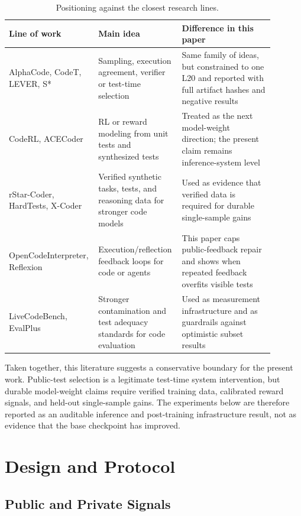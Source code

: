 \documentclass[11pt]{article}
\begin{document}
\begin{table}[H]
\centering
\small
\begin{tabular}{>{\raggedright\arraybackslash}p{0.25\linewidth}
                >{\raggedright\arraybackslash}p{0.30\linewidth}
                >{\raggedright\arraybackslash}p{0.34\linewidth}}
\toprule
Line of work & Main idea & Difference in this paper \\
\midrule
AlphaCode, CodeT, LEVER, S* & Sampling, execution agreement, verifier or
test-time selection & Same family of ideas, but constrained to one L20 and
reported with full artifact hashes and negative results \\
CodeRL, ACECoder & RL or reward modeling from unit tests and synthesized tests
& Treated as the next model-weight direction; the present claim remains
inference-system level \\
rStar-Coder, HardTests, X-Coder & Verified synthetic tasks, tests, and
reasoning data for stronger code models & Used as evidence that verified data
is required for durable single-sample gains \\
OpenCodeInterpreter, Reflexion & Execution/reflection feedback loops for code
or agents & This paper caps public-feedback repair and shows when repeated
feedback overfits visible tests \\
LiveCodeBench, EvalPlus & Stronger contamination and test adequacy standards
for code evaluation & Used as measurement infrastructure and as guardrails
against optimistic subset results \\
\bottomrule
\end{tabular}
\caption{Positioning against the closest research lines.}
\label{tab:positioning}
\end{table}

Taken together, this literature suggests a conservative boundary for the
present work. Public-test selection is a legitimate test-time system
intervention, but durable model-weight claims require verified training data,
calibrated reward signals, and held-out single-sample gains. The experiments
below are therefore reported as an auditable inference and post-training
infrastructure result, not as evidence that the base checkpoint has improved.

\section{Design and Protocol}

\subsection{Public and Private Signals}
\end{document}
